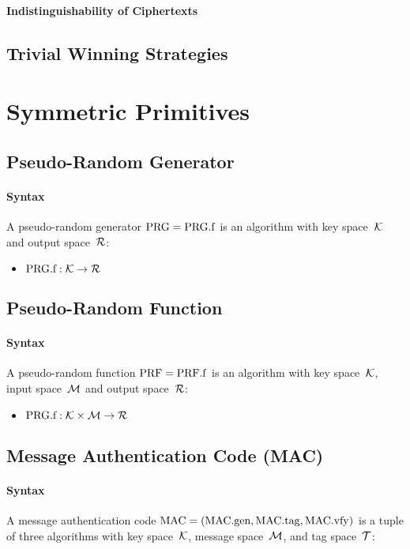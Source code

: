 \documentclass[a4paper,orivec]{llncs}
\begin{document}
\paragraph{Indistinguishability of Ciphertexts}

\subsection{Trivial Winning Strategies}


\section{Symmetric Primitives}


\subsection{Pseudo-Random Generator}


\paragraph{Syntax}
A pseudo-random generator $\mathrm{PRG}=\mathrm{PRG}.\mathrm{f}$ is an algorithm with key space~$\mathcal{K}$ and output space~$\mathcal{R}$:

\begin{itemize}
    \item $\mathrm{PRG}.\mathrm{f}: \mathcal{K} \to \mathcal{R}$
\end{itemize}

\subsection{Pseudo-Random Function}

\paragraph{Syntax}
A pseudo-random function $\mathrm{PRF}=\mathrm{PRF}.\mathrm{f}$ is an algorithm with key space~$\mathcal{K}$, input space~$\mathcal{M}$ and output space~$\mathcal{R}$:

\begin{itemize}
    \item $\mathrm{PRG}.\mathrm{f}: \mathcal{K}\times\mathcal{M} \to \mathcal{R}$
\end{itemize}

\subsection{Message Authentication Code (MAC)}

\paragraph{Syntax}
A message authentication code $\mathrm{MAC}=(\mathrm{MAC}.\mathrm{gen},\mathrm{MAC}.\mathrm{tag},\mathrm{MAC}.\mathrm{vfy})$ is a tuple of three algorithms with key space~$\mathcal{K}$, message space~$\mathcal{M}$, and tag space~$\mathcal{T}$:
\end{document}
